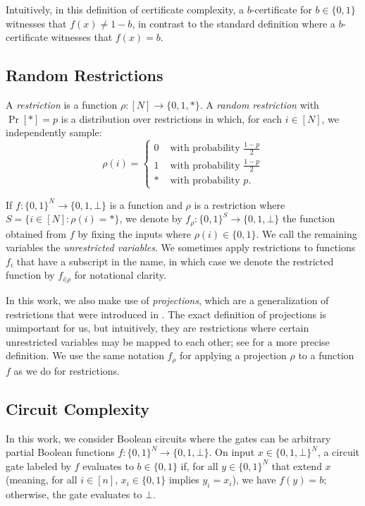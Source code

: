 \documentclass[11pt]{article}%
\begin{document}
Intuitively, in this definition of certificate complexity, a $b$-certificate for $b \in \{0,1\}$ witnesses that $f(x) \neq 1-b$, in contrast to the standard definition where a $b$-certificate witnesses that $f(x)=b$.

\subsection{Random Restrictions}
\label{sec:random_restrictions}
A \textit{restriction} is a function $\rho: [N] \to \{0,1,*\}$. A \textit{random restriction} with $\Pr[*] = p$ is a distribution over restrictions in which, for each $i \in [N]$, we independently sample:
\[
\rho(i) = \begin{cases}
0 & \text{ with probability } \frac{1-p}{2}\\
1 & \text{ with probability } \frac{1-p}{2}\\
* & \text{ with probability } p.
\end{cases}
\]

If $f: \{0,1\}^N \to \{0,1,\bot\}$ is a function and $\rho$ is a restriction where $S = \{i \in [N]: \rho(i) = *\}$, we denote by $f_\rho: \{0,1\}^S \to \{0,1,\bot\}$ the function obtained from $f$ by fixing the inputs where $\rho(i) \in \{0,1\}$. We call the remaining variables the \textit{unrestricted variables}. We sometimes apply restrictions to functions $f_i$ that have a subscript in the name, in which case we denote the restricted function by $f_{i|\rho}$ for notational clarity.

In this work, we also make use of \textit{projections}, which are a generalization of restrictions that were introduced in \cite{HRST17}. The exact definition of projections is unimportant for us, but intuitively, they are restrictions where certain unrestricted variables may be mapped to each other; see \cite{HRST17} for a more precise definition. We use the same notation $f_\rho$ for applying a projection $\rho$ to a function $f$ as we do for restrictions.

\subsection{Circuit Complexity}
\label{sec:circuit_complexity}
In this work, we consider Boolean circuits where the gates can be arbitrary partial Boolean functions $f: \{0,1\}^N \to \{0,1,\bot\}$. On input $x \in \{0,1,\bot\}^N$, a circuit gate labeled by $f$ evaluates to $b \in \{0,1\}$ if, for all $y \in \{0,1\}^N$ that extend $x$ (meaning, for all $i \in [n]$, $x_i \in \{0,1\}$ implies $y_i = x_i$), we have $f(y) = b$; otherwise, the gate evaluates to $\bot$.
\end{document}
